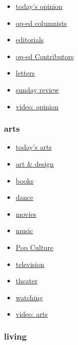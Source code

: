 \begin{itemize}
\tightlist
\item
  \href{https://www.nytimes.com/section/opinion}{today's opinion}
\item
  \href{https://www.nytimes.com/section/opinion/columnists}{op-ed
  columnists}
\item
  \href{https://www.nytimes.com/section/opinion/editorials}{editorials}
\item
  \href{https://www.nytimes.com/section/opinion/contributors}{op-ed
  Contributors}
\item
  \href{https://www.nytimes.com/section/opinion/letters}{letters}
\item
  \href{https://www.nytimes.com/section/opinion/sunday}{sunday review}
\item
  \href{https://www.nytimes.com/video/opinion}{video: opinion}
\end{itemize}

\hypertarget{arts}{%
\subsubsection{arts}\label{arts}}

\begin{itemize}
\tightlist
\item
  \href{https://www.nytimes.com/section/arts}{today's arts}
\item
  \href{https://www.nytimes.com/section/arts/design}{art \& design}
\item
  \href{https://www.nytimes.com/section/books}{books}
\item
  \href{https://www.nytimes.com/section/arts/dance}{dance}
\item
  \href{https://www.nytimes.com/section/movies}{movies}
\item
  \href{https://www.nytimes.com/section/arts/music}{music}
\item
  \href{https://www.nytimes.com/spotlight/pop-culture}{Pop Culture}
\item
  \href{https://www.nytimes.com/section/arts/television}{television}
\item
  \href{https://www.nytimes.com/section/theater}{theater}
\item
  \href{https://www.nytimes.com/watching}{watching}
\item
  \href{https://www.nytimes.com/video/arts}{video: arts}
\end{itemize}

\hypertarget{living}{%
\subsubsection{living}\label{living}}

